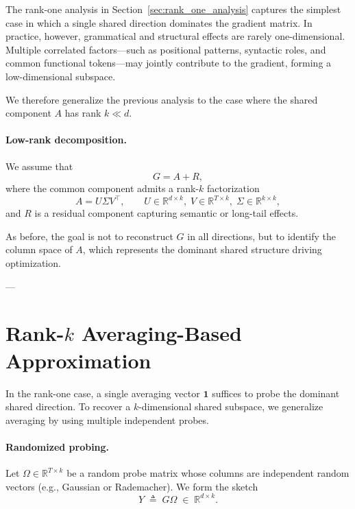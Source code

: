 \documentclass[11pt]{report}
\begin{document}
The rank-one analysis in Section~\ref{sec:rank_one_analysis} captures the simplest
case in which a single shared direction dominates the gradient matrix.
In practice, however, grammatical and structural effects are rarely one-dimensional.
Multiple correlated factors---such as positional patterns, syntactic roles, and
common functional tokens---may jointly contribute to the gradient, forming a
low-dimensional subspace.

We therefore generalize the previous analysis to the case where the shared component
$A$ has rank $k \ll d$.

\paragraph{Low-rank decomposition.}
We assume that
\begin{equation}
G = A + R,
\end{equation}
where the common component admits a rank-$k$ factorization
\begin{equation}
A = U \Sigma V^\top,
\qquad
U \in \mathbb{R}^{d\times k},\;
V \in \mathbb{R}^{T\times k},\;
\Sigma \in \mathbb{R}^{k\times k},
\end{equation}
and $R$ is a residual component capturing semantic or long-tail effects.

As before, the goal is not to reconstruct $G$ in all directions, but to identify the
column space of $A$, which represents the dominant shared structure driving
optimization.

---

\section{Rank-$k$ Averaging-Based Approximation}
\label{sec:rank_k_averaging}

In the rank-one case, a single averaging vector $\mathbf{1}$ suffices to probe the
dominant shared direction.
To recover a $k$-dimensional shared subspace, we generalize averaging by using
multiple independent probes.

\paragraph{Randomized probing.}
Let $\Omega \in \mathbb{R}^{T\times k}$ be a random probe matrix whose columns are
independent random vectors (e.g., Gaussian or Rademacher).
We form the sketch
\begin{equation}
Y \;\triangleq\; G \Omega \;\in\; \mathbb{R}^{d\times k}.
\end{equation}
\end{document}
